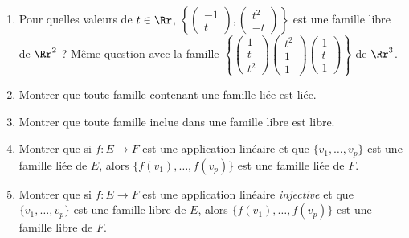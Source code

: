 \documentclass[class=report,crop=false]{standalone}
\begin{document}


\begin{miniexercices}
\sauteligne
\begin{enumerate}
  \item Pour quelles valeurs de $t\in\Rr$,
  $\left\{
  \left(\begin{smallmatrix} -1 \\ t \end{smallmatrix}\right),
  \left(\begin{smallmatrix} t^2 \\ -t \end{smallmatrix}\right)
  \right\}$
  est une famille libre de $\Rr^2$ ?
  Même question avec la famille
  $\left\{
  \left(\begin{smallmatrix} 1 \\ t \\ t^2 \end{smallmatrix}\right)
  \left(\begin{smallmatrix} t^2 \\ 1 \\ 1 \end{smallmatrix}\right)
  \left(\begin{smallmatrix} 1 \\ t \\ 1 \end{smallmatrix}\right)
  \right\}$ de $\Rr^3$.


  \item Montrer que toute famille contenant une famille liée est liée.

  \item Montrer que toute famille inclue dans une famille libre est libre.

  \item Montrer que si $f : E \to F$ est une application linéaire et que
  $\{ v_1, \ldots, v_p \}$ est une famille liée de $E$, alors
  $\{ f(v_1), \ldots, f(v_p) \}$ est une famille liée de $F$.

  \item Montrer que si $f : E \to F$ est une application linéaire \emph{injective}
  et que $\{ v_1, \ldots, v_p \}$ est une famille libre de $E$, alors
  $\{ f(v_1), \ldots, f(v_p) \}$ est une famille libre de $F$.

\end{enumerate}
\end{miniexercices}
\end{document}

